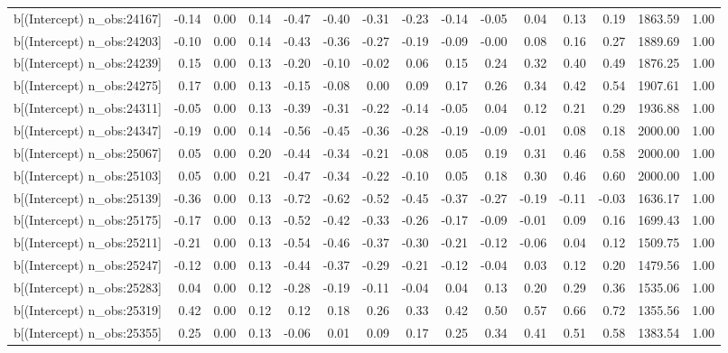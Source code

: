 \begin{table}[ht]
\begin{tabular}{rrrrrrrrrrrrrrr}
  b[(Intercept) n\_obs:24167] & -0.14 & 0.00 & 0.14 & -0.47 & -0.40 & -0.31 & -0.23 & -0.14 & -0.05 & 0.04 & 0.13 & 0.19 & 1863.59 & 1.00 \\ 
  b[(Intercept) n\_obs:24203] & -0.10 & 0.00 & 0.14 & -0.43 & -0.36 & -0.27 & -0.19 & -0.09 & -0.00 & 0.08 & 0.16 & 0.27 & 1889.69 & 1.00 \\ 
  b[(Intercept) n\_obs:24239] & 0.15 & 0.00 & 0.13 & -0.20 & -0.10 & -0.02 & 0.06 & 0.15 & 0.24 & 0.32 & 0.40 & 0.49 & 1876.25 & 1.00 \\ 
  b[(Intercept) n\_obs:24275] & 0.17 & 0.00 & 0.13 & -0.15 & -0.08 & 0.00 & 0.09 & 0.17 & 0.26 & 0.34 & 0.42 & 0.54 & 1907.61 & 1.00 \\ 
  b[(Intercept) n\_obs:24311] & -0.05 & 0.00 & 0.13 & -0.39 & -0.31 & -0.22 & -0.14 & -0.05 & 0.04 & 0.12 & 0.21 & 0.29 & 1936.88 & 1.00 \\ 
  b[(Intercept) n\_obs:24347] & -0.19 & 0.00 & 0.14 & -0.56 & -0.45 & -0.36 & -0.28 & -0.19 & -0.09 & -0.01 & 0.08 & 0.18 & 2000.00 & 1.00 \\ 
  b[(Intercept) n\_obs:25067] & 0.05 & 0.00 & 0.20 & -0.44 & -0.34 & -0.21 & -0.08 & 0.05 & 0.19 & 0.31 & 0.46 & 0.58 & 2000.00 & 1.00 \\ 
  b[(Intercept) n\_obs:25103] & 0.05 & 0.00 & 0.21 & -0.47 & -0.34 & -0.22 & -0.10 & 0.05 & 0.18 & 0.30 & 0.46 & 0.60 & 2000.00 & 1.00 \\ 
  b[(Intercept) n\_obs:25139] & -0.36 & 0.00 & 0.13 & -0.72 & -0.62 & -0.52 & -0.45 & -0.37 & -0.27 & -0.19 & -0.11 & -0.03 & 1636.17 & 1.00 \\ 
  b[(Intercept) n\_obs:25175] & -0.17 & 0.00 & 0.13 & -0.52 & -0.42 & -0.33 & -0.26 & -0.17 & -0.09 & -0.01 & 0.09 & 0.16 & 1699.43 & 1.00 \\ 
  b[(Intercept) n\_obs:25211] & -0.21 & 0.00 & 0.13 & -0.54 & -0.46 & -0.37 & -0.30 & -0.21 & -0.12 & -0.06 & 0.04 & 0.12 & 1509.75 & 1.00 \\ 
  b[(Intercept) n\_obs:25247] & -0.12 & 0.00 & 0.13 & -0.44 & -0.37 & -0.29 & -0.21 & -0.12 & -0.04 & 0.03 & 0.12 & 0.20 & 1479.56 & 1.00 \\ 
  b[(Intercept) n\_obs:25283] & 0.04 & 0.00 & 0.12 & -0.28 & -0.19 & -0.11 & -0.04 & 0.04 & 0.13 & 0.20 & 0.29 & 0.36 & 1535.06 & 1.00 \\ 
  b[(Intercept) n\_obs:25319] & 0.42 & 0.00 & 0.12 & 0.12 & 0.18 & 0.26 & 0.33 & 0.42 & 0.50 & 0.57 & 0.66 & 0.72 & 1355.56 & 1.00 \\ 
  b[(Intercept) n\_obs:25355] & 0.25 & 0.00 & 0.13 & -0.06 & 0.01 & 0.09 & 0.17 & 0.25 & 0.34 & 0.41 & 0.51 & 0.58 & 1383.54 & 1.00 \\ 

\end{tabular}
\end{table}
